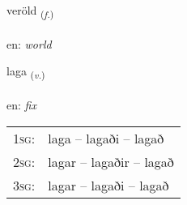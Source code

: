 \documentclass[frontgrid, backgrid]{flacards}\usepackage[]{graphicx}\usepackage[]{color}
\begin{document}
\renewcommand{\blhead}{\vskip5pt {\small\bfseries\footnotesize Nafnorð | Noun }}
\renewcommand{\bcfoot}{\vskip5pt \hspace{2pt}{\small\bfseries\footnotesize 2K}}


{veröld \small{\textsubscript{(\textit{f.})}} \\[1ex] %
\textphonetic{[vɛːrœlt]} \\
en: \emph{world} \\  [2ex]
\renewcommand*{\arraystretch}{0.8}
}

\renewcommand{\flhead}{\vskip5pt \fboxsep=0pt {\small\bfseries\footnotesize Sagnorð | Verb}}
\renewcommand{\fcfoot}{\vskip5pt \fboxsep=0pt \hspace{2pt}{\small\bfseries\footnotesize 2K}}

\renewcommand{\blhead}{\vskip5pt {\small\bfseries\footnotesize Sagnorð | Verb }}
\renewcommand{\bcfoot}{\vskip5pt \hspace{2pt}{\small\bfseries\footnotesize 2K}}


{laga \small{\textsubscript{(\textit{v.})}} \\[1ex] %
\textphonetic{[laːɣa]} \\
en: \emph{fix} \\  [2ex]
\renewcommand*{\arraystretch}{0.8}
\begin{tabular}{p{1cm}l}
\textsc{1sg}: & laga -- lagaði -- lagað \\ 
\textsc{2sg}: & lagar -- lagaðir -- lagað \\ 
\textsc{3sg}: & lagar -- lagaði -- lagað \\ 
\end{tabular}
}

\renewcommand{\flhead}{\vskip5pt \fboxsep=0pt {\small\bfseries\footnotesize Sagnorð | Verb}}
\renewcommand{\fcfoot}{\vskip5pt \fboxsep=0pt \hspace{2pt}{\small\bfseries\footnotesize 2K}}
\end{document}
